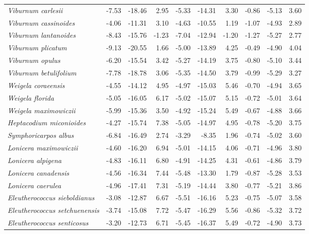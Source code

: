 \documentclass[11pt]{article}
\begin{document}
\begin{longtable}{lrrrrrrrrr}
  \emph{Viburnum carlesii} & -7.53 & -18.46 & 2.95 & -5.33 & -14.31 & 3.30 & -0.86 & -5.13 & 3.60 \\ 
  \emph{Viburnum cassinoides} & -4.06 & -11.31 & 3.10 & -4.63 & -10.55 & 1.19 & -1.07 & -4.93 & 2.89 \\ 
  \emph{Viburnum lantanoides} & -8.43 & -15.76 & -1.23 & -7.04 & -12.94 & -1.20 & -1.27 & -5.27 & 2.77 \\ 
  \emph{Viburnum plicatum} & -9.13 & -20.55 & 1.66 & -5.00 & -13.89 & 4.25 & -0.49 & -4.90 & 4.04 \\ 
  \emph{Viburnum opulus} & -6.20 & -15.54 & 3.42 & -5.27 & -14.19 & 3.75 & -0.80 & -5.10 & 3.44 \\ 
  \emph{Viburnum betulifolium} & -7.78 & -18.78 & 3.06 & -5.35 & -14.50 & 3.79 & -0.99 & -5.29 & 3.27 \\ 
  \emph{Weigela coraeensis} & -4.55 & -14.12 & 4.95 & -4.97 & -15.03 & 5.46 & -0.70 & -4.94 & 3.65 \\ 
  \emph{Weigela florida} & -5.05 & -16.05 & 6.17 & -5.02 & -15.07 & 5.15 & -0.72 & -5.01 & 3.64 \\ 
  \emph{Weigela maximowiczii} & -5.99 & -15.36 & 3.50 & -4.92 & -15.24 & 5.49 & -0.67 & -4.88 & 3.66 \\ 
  \emph{Heptacodium miconioides} & -4.27 & -15.74 & 7.38 & -5.05 & -14.97 & 4.95 & -0.78 & -5.20 & 3.75 \\ 
  \emph{Symphoricarpos albus} & -6.84 & -16.49 & 2.74 & -3.29 & -8.35 & 1.96 & -0.74 & -5.02 & 3.60 \\ 
  \emph{Lonicera maximowiczii} & -4.60 & -16.20 & 6.94 & -5.01 & -14.15 & 4.06 & -0.71 & -4.96 & 3.80 \\ 
  \emph{Lonicera alpigena} & -4.83 & -16.11 & 6.80 & -4.91 & -14.25 & 4.31 & -0.61 & -4.86 & 3.79 \\ 
  \emph{Lonicera canadensis} & -4.56 & -16.34 & 7.44 & -5.48 & -13.30 & 1.79 & -0.87 & -5.28 & 3.53 \\ 
  \emph{Lonicera caerulea} & -4.96 & -17.41 & 7.31 & -5.19 & -14.44 & 3.80 & -0.77 & -5.21 & 3.86 \\ 
  \emph{Eleutherococcus sieboldianus} & -3.08 & -12.87 & 6.67 & -5.51 & -16.16 & 5.23 & -0.75 & -5.07 & 3.58 \\ 
  \emph{Eleutherococcus setchuenensis} & -3.74 & -15.08 & 7.72 & -5.47 & -16.29 & 5.56 & -0.86 & -5.32 & 3.72 \\ 
  \emph{Eleutherococcus senticosus} & -3.20 & -12.73 & 6.71 & -5.45 & -16.37 & 5.49 & -0.72 & -4.90 & 3.73 \\ 

\end{longtable}
\end{document}

